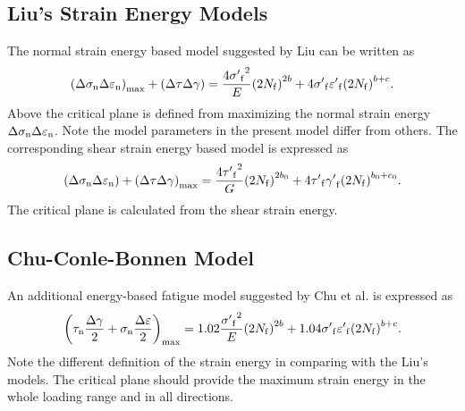 \subsection{Liu's Strain Energy Models}
\noindent
The normal strain energy based model suggested by Liu \cite{Socie2000} can be written as
\begin{equation}
{\left( {\Delta {\sigma _{\rm n}}\Delta {\varepsilon _{\rm n}}} \right)_{\max }} + \left( {\Delta \tau \Delta \gamma } \right) = \frac{{4{{\sigma '}_{\rm f}}^2}}{E}{\left( {2{N_{\rm f}}} \right)^{2b}} + 4{{\sigma '}_{\rm f}}{{\varepsilon '}_{\rm f}}{\left( {2{N_{\rm f}}} \right)^{b + c}}.
\label{Equ:Liu1_model}
\end{equation}
Above the critical plane is defined from maximizing the normal strain energy ${\Delta {\sigma _{\rm n}}\Delta {\varepsilon _{\rm n}}}$. Note the model parameters in the present model differ from others. The corresponding shear strain energy based model is expressed as
\begin{equation}
\left( {\Delta {\sigma _{\rm n}}\Delta {\varepsilon _{\rm n}}} \right) + {\left( {\Delta \tau \Delta \gamma } \right)_{\max }} = \frac{{4{{\tau '}_{\rm f}}^2}}{G}{\left( {2{N_{\rm f}}} \right)^{2b_0 }} + 4{{\tau '}_{\rm f}}{{\gamma '}_{\rm f}}{\left( {2{N_{\rm f}}} \right)^{b_0  + c_0 }}.
\label{Equ:Liu2_model}
\end{equation}
The critical plane is calculated from the shear strain energy.

\subsection{Chu-Conle-Bonnen Model}
\noindent
An additional energy-based fatigue model suggested by Chu et al. \cite{Socie2000} is expressed as
\begin{equation}
{\left( {{\tau _{\rm n}}\frac{{\Delta \gamma }}{2} + {\sigma _{\rm n }}\frac{{\Delta \varepsilon }}{2}} \right)_{\max }} = 1.02\frac{{{{\sigma '}_{\rm f}}^2}}{E}{\left( {2{N_{\rm f}}} \right)^{2b}} + 1.04{{\sigma '}_{\rm f}}{{\varepsilon '}_{\rm f}}{\left( {2{N_{\rm f}}} \right)^{b + c}}.
\label{Equ:CCB_model}
\end{equation}
Note the different definition of the strain energy in comparing with the Liu's models. The critical plane should provide the maximum strain energy in the whole loading range and in all directions.

